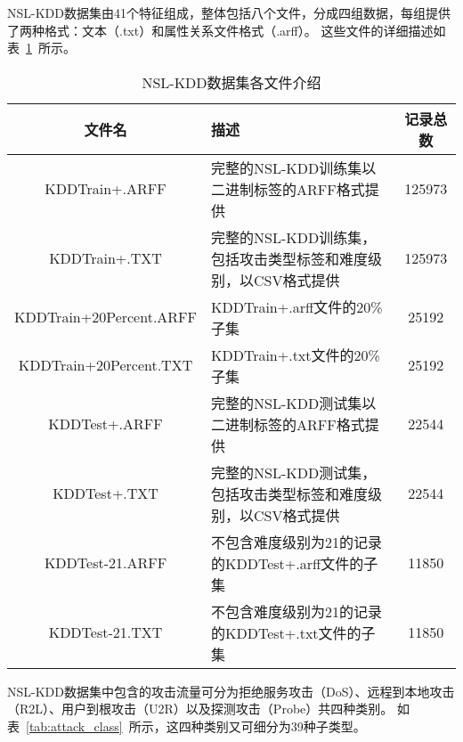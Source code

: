 NSL-KDD数据集由41个特征组成，整体包括八个文件，分成四组数据，每组提供了两种格式：文本（.txt）和属性关系文件格式（.arff）。
这些文件的详细描述如表~\ref{tab:NSLKDDFile}~所示。
\begin{table}[htbp]
	\caption{NSL-KDD数据集各文件介绍}
	\label{tab:NSLKDDFile}
	\begin{tabularx}{\textwidth}{cXc}
		\toprule
		\textbf{文件名}         & \textbf{描述}                                                  & \textbf{记录总数} \\
		\midrule
		KDDTrain+.ARFF          & 完整的NSL-KDD训练集以二进制标签的ARFF格式提供                  & 125973            \\
		KDDTrain+.TXT           & 完整的NSL-KDD训练集，包括攻击类型标签和难度级别，以CSV格式提供 & 125973            \\
		KDDTrain+20Percent.ARFF & KDDTrain+.arff文件的20\%子集                                   & 25192             \\
		KDDTrain+20Percent.TXT  & KDDTrain+.txt文件的20\%子集                                    & 25192             \\
		KDDTest+.ARFF           & 完整的NSL-KDD测试集以二进制标签的ARFF格式提供                  & 22544             \\
		KDDTest+.TXT            & 完整的NSL-KDD测试集，包括攻击类型标签和难度级别，以CSV格式提供 & 22544             \\
		KDDTest-21.ARFF         & 不包含难度级别为21的记录的KDDTest+.arff文件的子集              & 11850             \\
		KDDTest-21.TXT          & 不包含难度级别为21的记录的KDDTest+.txt文件的子集               & 11850             \\
		\bottomrule
	\end{tabularx}
\end{table}
NSL-KDD数据集中包含的攻击流量可分为拒绝服务攻击（DoS）、远程到本地攻击（R2L）、用户到根攻击（U2R）以及探测攻击（Probe）共四种类别。
如表~\ref{tab:attack_class}~所示，这四种类别又可细分为39种子类型。
